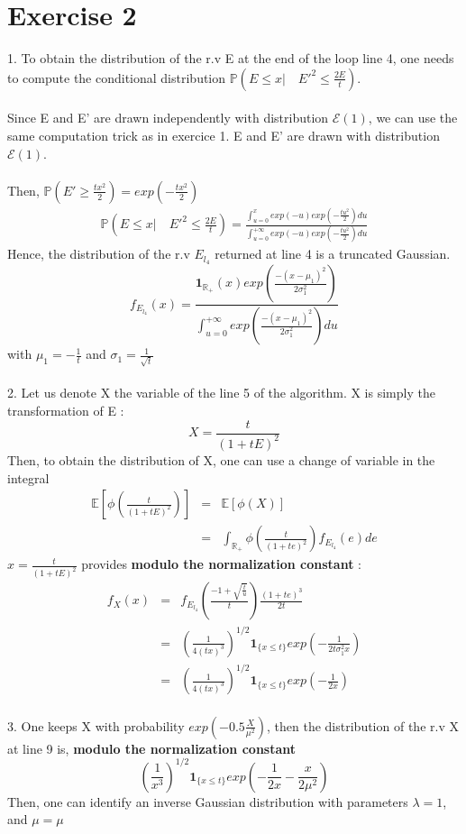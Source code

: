 \section*{Exercise 2}
1. To obtain the distribution of the r.v E at the end of the loop line 4, one needs to compute the conditional distribution $ \mathbb{P}(E \leq x | \quad E'^{2} \leq \frac{2E}{t})$.~\\
~\\
Since E and E' are drawn independently with distribution $\mathcal{E}(1)$, we can use the same computation trick as in exercice 1. E and E' are drawn with distribution $\mathcal{E}(1)$.~\\
~\\
Then, $\mathbb{P}(E' \geq \frac{tx^{2}}{2})=exp(-\frac{tx^{2}}{2})$
\begin{eqnarray*}
	\mathbb{P}(E \leq x | \quad E'^{2} \leq \frac{2E}{t}) = \frac{\int_{u=0}^{x}exp(-u)exp(-\frac{tu^{2}}{2})du}{\int_{u=0}^{+\infty}exp(-u)exp(-\frac{tu^{2}}{2})du}
\end{eqnarray*}
Hence, the distribution of the r.v $E_{l_{4}}$ returned at line 4 is a truncated Gaussian.
$$f_{E_{l_{4}}}(x)=\frac{\textbf{1}_{\mathbb{R}_{+}}(x)exp(\frac{-(x-\mu_1)^{2}}{2\sigma_1^{2}})}{\int_{u=0}^{+\infty}exp(\frac{-(x-\mu_1)^{2}}{2\sigma_1^{2}})du}$$
with $\mu_1=-\frac{1}{t}$ and $\sigma_1=\frac{1}{\sqrt{t}}$~\\
~\\
2. Let us denote X the variable of the line 5 of the algorithm. X is simply the transformation of E :
$$X=\frac{t}{(1+tE)^{2}}$$
Then, to obtain the distribution of X, one can use a change of variable in the integral 
\begin{eqnarray*}
	\mathbb{E}[\phi(\frac{t}{(1+tE)^{2}})]&=&\mathbb{E}[\phi(X)]\\
	&=&\int_{\mathbb{R_+}}\phi(\frac{t}{(1+te)^{2}})f_{E_{l_{4}}}(e)de
\end{eqnarray*}
$x=\frac{t}{(1+tE)^{2}}$ provides \textbf{modulo the normalization constant} :
\begin{eqnarray*}
	f_{X}(x)&=& f_{E_{l_{4}}}(\frac{-1+\sqrt{\frac{t}{u}}}{t})\frac{(1+te)^{3}}{2t}\\
	&=&(\frac{1}{4(tx)^{3}})^{1/2}\textbf{1}_{\{x \leq t\}} exp(-\frac{1}{2t\sigma_1^{2}x})\\
	&=&(\frac{1}{4(tx)^{3}})^{1/2}\textbf{1}_{\{x \leq t\}} exp(-\frac{1}{2x})
\end{eqnarray*}
~\\
3. One keeps X with probability $exp(-0.5\frac{X}{\mu^{2}})$, then the distribution of the r.v X at line 9 is, \textbf{modulo the normalization constant}  
$$(\frac{1}{x^{3}})^{1/2}\textbf{1}_{\{x \leq t\}} exp(-\frac{1}{2x}-\frac{x}{2\mu^{2}})$$
Then, one can identify an inverse Gaussian distribution with parameters $\boxed{\lambda=1}$, and $\boxed{\mu=\mu}$
